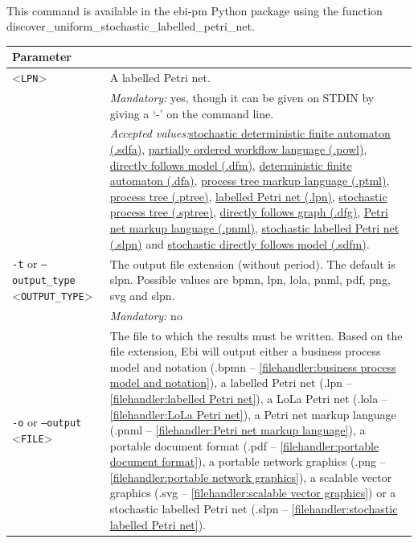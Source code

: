 {\\This command is available in the ebi-pm Python package using the function discover\_uniform\_stochastic\_labelled\_petri\_net.
\begin{tabularx}{\linewidth}{lX}
\toprule
Parameter \\\midrule
<\texttt{LPN}>&A labelled Petri net.\\
&\textit{Mandatory:} \quad yes, though it can be given on STDIN by giving a `-' on the command line.\\
&\textit{Accepted values:}\quad \hyperref[filehandler:stochastic deterministic finite automaton]{stochastic deterministic finite automaton (.sdfa)}, \hyperref[filehandler:partially ordered workflow language]{partially ordered workflow language (.powl)}, \hyperref[filehandler:directly follows model]{directly follows model (.dfm)}, \hyperref[filehandler:deterministic finite automaton]{deterministic finite automaton (.dfa)}, \hyperref[filehandler:process tree markup language]{process tree markup language (.ptml)}, \hyperref[filehandler:process tree]{process tree (.ptree)}, \hyperref[filehandler:labelled Petri net]{labelled Petri net (.lpn)}, \hyperref[filehandler:stochastic process tree]{stochastic process tree (.sptree)}, \hyperref[filehandler:directly follows graph]{directly follows graph (.dfg)}, \hyperref[filehandler:Petri net markup language]{Petri net markup language (.pnml)}, \hyperref[filehandler:stochastic labelled Petri net]{stochastic labelled Petri net (.slpn)} and \hyperref[filehandler:stochastic directly follows model]{stochastic directly follows model (.sdfm)}.\\
\texttt{-t} or \texttt{--output\_type} <\texttt{OUTPUT\_TYPE}> &
The output file extension (without period). The default is slpn. Possible values are bpmn, lpn, lola, pnml, pdf, png, svg and slpn.\\
&\textit{Mandatory:} \quad no\\
\texttt{-o} or \texttt{--output} <\texttt{FILE}> &
The file to which the results must be written. Based on the file extension, Ebi will output either a business process model and notation (.bpmn -- \cref{filehandler:business process model and notation}), a labelled Petri net (.lpn -- \cref{filehandler:labelled Petri net}), a LoLa Petri net (.lola -- \cref{filehandler:LoLa Petri net}), a Petri net markup language (.pnml -- \cref{filehandler:Petri net markup language}), a portable document format (.pdf -- \cref{filehandler:portable document format}), a portable network graphics (.png -- \cref{filehandler:portable network graphics}), a scalable vector graphics (.svg -- \cref{filehandler:scalable vector graphics}) or a stochastic labelled Petri net (.slpn -- \cref{filehandler:stochastic labelled Petri net}).

\end{tabularx}}
